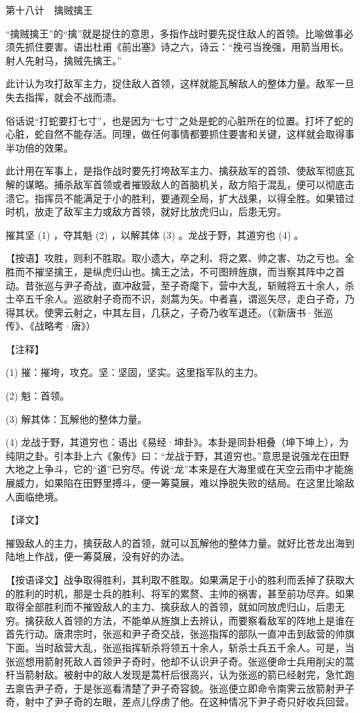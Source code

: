 \documentclass[12pt,UTF8]{ctexbook}
\begin{document}
第十八计　擒贼擒王


“擒贼擒王”的“擒”就是捉住的意思，多指作战时要先捉住敌人的首领。比喻做事必须先抓住要害。语出杜甫《前出塞》诗之六，诗云：“挽弓当挽强，用箭当用长。射人先射马，擒贼先擒王。”

此计认为攻打敌军主力，捉住敌人首领，这样就能瓦解敌人的整体力量。敌军一旦失去指挥，就会不战而溃。

俗话说“打蛇要打七寸”，也是因为“七寸”之处是蛇的心脏所在的位置。打坏了蛇的心脏，蛇自然不能存活。同理，做任何事情都要抓住要害和关键，这样就会取得事半功倍的效果。

此计用在军事上，是指作战时要先打垮敌军主力、擒获敌军的首领、使敌军彻底瓦解的谋略。捕杀敌军首领或者摧毁敌人的首脑机关，敌方陷于混乱，便可以彻底击溃它。指挥员不能满足于小的胜利，要通观全局，扩大战果，以得全胜。如果错过时机，放走了敌军主力或敌方首领，就好比放虎归山，后患无穷。





摧其坚 (1) ，夺其魁 (2) ，以解其体 (3) 。龙战于野，其道穷也 (4) 。

【按语】攻胜，则利不胜取。取小遗大，卒之利、将之累、帅之害、功之亏也。全胜而不摧坚擒王，是纵虎归山也。擒王之法，不可图辨旌旗，而当察其阵中之首动。昔张巡与尹子奇战，直冲敌营，至子奇麾下，营中大乱，斩贼将五十余人，杀士卒五千余人。巡欲射子奇而不识，剡蒿为矢。中者喜，谓巡矢尽，走白子奇，乃得其状。使霁云射之，中其左目，几获之，子奇乃收军退还。（《新唐书·张巡传》、《战略考·唐》）





【注释】


(1) 摧：摧垮，攻克。坚：坚固，坚实。这里指军队的主力。

(2) 魁：首领。

(3) 解其体：瓦解他的整体力量。

(4) 龙战于野，其道穷也：语出《易经·坤卦》。本卦是同卦相叠（坤下坤上），为纯阴之卦。引本卦上六《象传》曰：“龙战于野，其道穷也。”意思是说强龙在田野大地之上争斗，它的“道”已穷尽。传说“龙”本来是在大海里或在天空云雨中才能施展威力，如果陷在田野里搏斗，便一筹莫展，难以挣脱失败的结局。在这里比喻敌人面临绝境。





【译文】


摧毁敌人的主力，擒获敌人的首领，就可以瓦解他的整体力量。就好比苍龙出海到陆地上作战，便一筹莫展，没有好的办法。

【按语译文】战争取得胜利，其利取不胜取。如果满足于小的胜利而丢掉了获取大的胜利的时机，那是士兵的胜利、将军的累赘、主帅的祸害，甚至前功尽弃。如果取得全部胜利而不摧毁敌人的主力、擒获敌人的首领，就如同放虎归山，后患无穷。擒获敌人首领的方法，不能单从旌旗上去辨认，而要察看敌军的阵地上是谁在首先行动。唐肃宗时，张巡和尹子奇交战，张巡指挥的部队一直冲击到敌营的帅旗下面。当时敌营大乱，张巡指挥斩杀将领五十余人，斩杀士兵五千余人。可是，当张巡想用箭射死敌人首领尹子奇时，他却不认识尹子奇。张巡便命士兵用削尖的蒿杆当箭射敌。被射中的敌人发现是蒿杆后很高兴，认为张巡的箭已经射完，急忙跑去禀告尹子奇，于是张巡看清楚了尹子奇容貌。张巡便立即命令南霁云放箭射尹子奇，射中了尹子奇的左眼，差点儿俘虏了他。在这种情况下尹子奇只好收兵回营。
\end{document}
